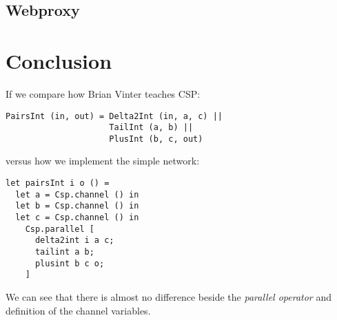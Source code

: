\documentclass[a4paper,12pt]{article}
\begin{document}
\subsection{Webproxy}


\section{Conclusion}
\label{conclusion}

If we compare how Brian Vinter teaches CSP\cite{vinter}:
\begin{center}
\begin{verbatim}
PairsInt (in, out) = Delta2Int (in, a, c) || 
                     TailInt (a, b) || 
                     PlusInt (b, c, out) 
\end{verbatim}
\end{center}

versus how we implement the simple network:

\begin{verbatim}
let pairsInt i o () =
  let a = Csp.channel () in
  let b = Csp.channel () in
  let c = Csp.channel () in
    Csp.parallel [
      delta2int i a c;
      tailint a b;
      plusint b c o;
    ]
\end{verbatim}

We can see that there is almost no difference beside the {\it parallel operator}
and definition of the channel variables.
\end{document}
